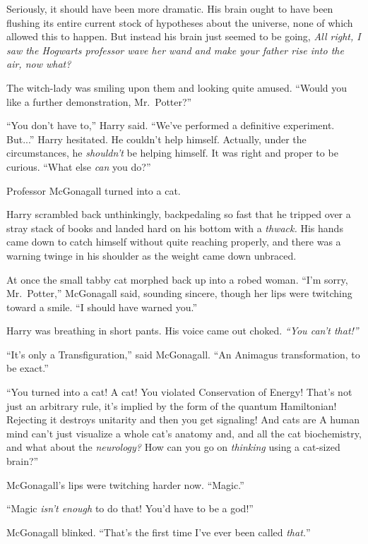 Seriously, it should have been more dramatic. His brain ought to have been flushing its entire current stock of hypotheses about the universe, none of which allowed this to happen. But instead his brain just seemed to be going, \emph{All right, I saw the Hogwarts professor wave her wand and make your father rise into the air, now what?}

The witch-lady was smiling upon them and looking quite amused. “Would you like a further demonstration, Mr.~Potter?”

“You don’t have to,” Harry said. “We’ve performed a definitive experiment. But...” Harry hesitated. He couldn’t help himself. Actually, under the circumstances, he \emph{shouldn’t} be helping himself. It was right and proper to be curious. “What else \emph{can} you do?”

Professor McGonagall turned into a cat.

Harry scrambled back unthinkingly, backpedaling so fast that he tripped over a stray stack of books and landed hard on his bottom with a \emph{thwack.} His hands came down to catch himself without quite reaching properly, and there was a warning twinge in his shoulder as the weight came down unbraced.

At once the small tabby cat morphed back up into a robed woman. “I’m sorry, Mr.~Potter,” McGonagall said, sounding sincere, though her lips were twitching toward a smile. “I should have warned you.”

Harry was breathing in short pants. His voice came out choked. \emph{“You can’t  that!”}

“It’s only a Transfiguration,” said McGonagall. “An Animagus transformation, to be exact.”

“You turned into a cat! A  cat! You violated Conservation of Energy! That’s not just an arbitrary rule, it’s implied by the form of the quantum Hamiltonian! Rejecting it destroys unitarity and then you get  signaling! And cats are  A human mind can’t just visualize a whole cat’s anatomy and, and all the cat biochemistry, and what about the \emph{neurology?} How can you go on \emph{thinking} using a cat-sized brain?”

McGonagall’s lips were twitching harder now. “Magic.”

“Magic \emph{isn’t enough} to do that! You’d have to be a god!”

McGonagall blinked. “That’s the first time I’ve ever been called \emph{that.}”


